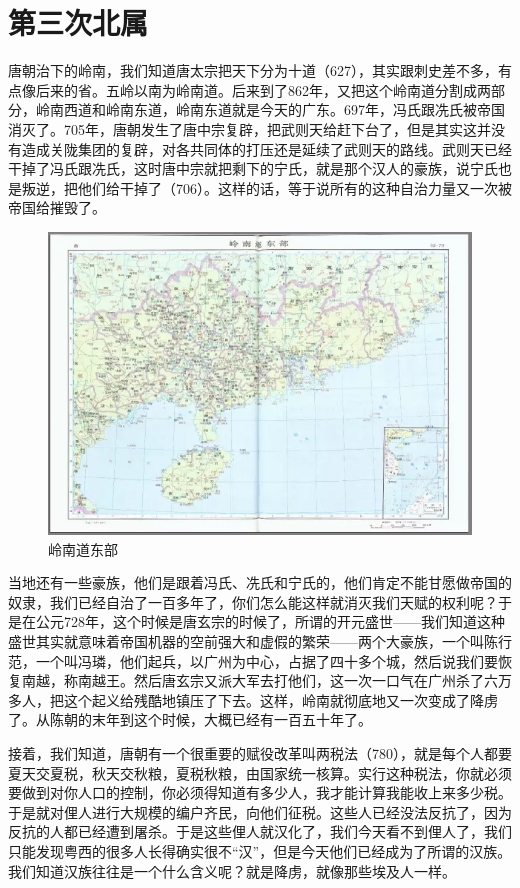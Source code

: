 \section{第三次北属}

唐朝治下的岭南，我们知道唐太宗把天下分为十道（627），其实跟刺史差不多，有点像后来的省。五岭以南为岭南道。后来到了862年，又把这个岭南道分割成两部分，岭南西道和岭南东道，岭南东道就是今天的广东。697年，冯氏跟冼氏被帝国消灭了。705年，唐朝发生了唐中宗复辟，把武则天给赶下台了，但是其实这并没有造成关陇集团的复辟，对各共同体的打压还是延续了武则天的路线。武则天已经干掉了冯氏跟冼氏，这时唐中宗就把剩下的宁氏，就是那个汉人的豪族，说宁氏也是叛逆，把他们给干掉了（706）。这样的话，等于说所有的这种自治力量又一次被帝国给摧毁了。

\begin{figure}
	\centering
	\includegraphics[width=\textwidth]{images/image-25}
	\caption{岭南道东部}
\end{figure}

当地还有一些豪族，他们是跟着冯氏、冼氏和宁氏的，他们肯定不能甘愿做帝国的奴隶，我们已经自治了一百多年了，你们怎么能这样就消灭我们天赋的权利呢？于是在公元728年，这个时候是唐玄宗的时候了，所谓的开元盛世——我们知道这种盛世其实就意味着帝国机器的空前强大和虚假的繁荣——两个大豪族，一个叫陈行范，一个叫冯璘，他们起兵，以广州为中心，占据了四十多个城，然后说我们要恢复南越，称南越王。然后唐玄宗又派大军去打他们，这一次一口气在广州杀了六万多人，把这个起义给残酷地镇压了下去。这样，岭南就彻底地又一次变成了降虏了。从陈朝的末年到这个时候，大概已经有一百五十年了。

接着，我们知道，唐朝有一个很重要的赋役改革叫两税法（780），就是每个人都要夏天交夏税，秋天交秋粮，夏税秋粮，由国家统一核算。实行这种税法，你就必须要做到对你人口的控制，你必须得知道有多少人，我才能计算我能收上来多少税。于是就对俚人进行大规模的编户齐民，向他们征税。这些人已经没法反抗了，因为反抗的人都已经遭到屠杀。于是这些俚人就汉化了，我们今天看不到俚人了，我们只能发现粤西的很多人长得确实很不“汉”，但是今天他们已经成为了所谓的汉族。我们知道汉族往往是一个什么含义呢？就是降虏，就像那些埃及人一样。

